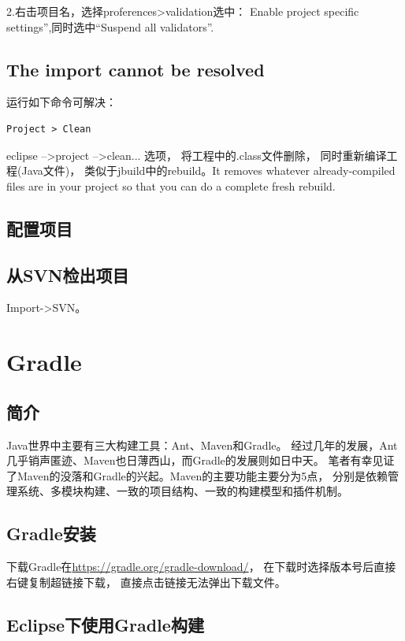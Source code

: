 \documentclass{book}
\begin{document}
2.右击项目名，选择proferences>validation选中：
Enable project specific settings”,同时选中“Suspend all validators”.

\subsection{The import cannot be resolved}

运行如下命令可解决：

\begin{lstlisting}
Project > Clean
\end{lstlisting}

eclipse -->project -->clean... 选项， 将工程中的.class文件删除，
同时重新编译工程(Java文件)，
类似于jbuild中的rebuild。It removes whatever already-compiled files 
are in your project so that you can do a complete fresh rebuild.

\subsection{配置项目}

\subsection{从SVN检出项目}

Import->SVN。

\section{Gradle}

\subsection{简介}

Java世界中主要有三大构建工具：Ant、Maven和Gradle。
经过几年的发展，Ant几乎销声匿迹、Maven也日薄西山，而Gradle的发展则如日中天。
笔者有幸见证了Maven的没落和Gradle的兴起。Maven的主要功能主要分为5点，
分别是依赖管理系统、多模块构建、一致的项目结构、一致的构建模型和插件机制。

\subsection{Gradle安装}

下载Gradle在\url{https://gradle.org/gradle-download/}，
在下载时选择版本号后直接右键复制超链接下载，
直接点击链接无法弹出下载文件。

\subsection{Eclipse下使用Gradle构建}
\end{document}
